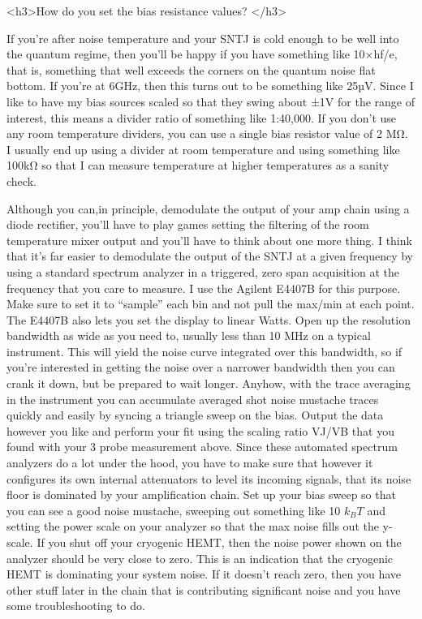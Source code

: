 \documentclass[11pt]{article}
\begin{document}
<h3>How do you set the bias resistance values? </h3>



If you’re after noise temperature and your SNTJ is cold enough to be well into the quantum regime, then you’ll be happy if you have something like 10×hf/e, that is, something that well exceeds the corners on the quantum noise ﬂat bottom. If you’re at 6GHz, then this turns out to be something like 25µV. Since I like to have my bias sources scaled so that they swing about ±1V for the range of interest, this means a divider ratio of something like 1:40,000. If you don’t use any room temperature dividers, you can use a single bias resistor value of 2 MΩ. I usually end up using a divider at room temperature and using something like 100kΩ so that I can measure temperature at higher temperatures as a sanity check.





Although you can,in principle, demodulate the output of your amp chain using a diode rectifier, you’ll have to play games setting the ﬁltering of the room temperature mixer output and you’ll have to think about one more thing. I think that it’s far easier to demodulate the output of the SNTJ at a given frequency by using a standard spectrum analyzer in a triggered, zero span acquisition at the frequency that you care to measure. I use the Agilent E4407B for this purpose. Make sure to set it to “sample” each bin and not pull the max/min at each point. The E4407B also lets you set the display to linear Watts. Open up the resolution bandwidth as wide as you need to, usually less than 10 MHz on a typical instrument. This will yield the noise curve integrated over this bandwidth, so if you’re interested in getting the noise over a narrower bandwidth then you can crank it down, but be prepared to wait longer. Anyhow, with the trace averaging in the instrument you can accumulate averaged shot noise mustache traces quickly and easily by syncing a triangle sweep on the bias. Output the data however you like and perform your ﬁt using the scaling ratio VJ/VB that you found with your 3 probe measurement above. Since these automated spectrum analyzers do a lot under the hood, you have to make sure that however it conﬁgures its own internal attenuators to level its incoming signals, that its noise ﬂoor is dominated by your amplification chain. Set up your bias sweep so that you can see a good noise mustache, sweeping out something like 10 $k_BT$  and setting the power scale on your analyzer so that the max noise fills out the y-scale. If you shut off your cryogenic HEMT, then the noise power shown on the analyzer should be very close to zero. This is an indication that the cryogenic HEMT is dominating your system noise. If it doesn’t reach zero, then you have other stuff later in the chain that is contributing significant noise and you have some troubleshooting to do.
\end{document}
